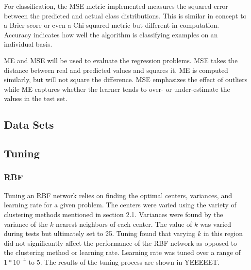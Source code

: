 \documentclass[twoside,11pt]{article}
\begin{document}
For classification, the MSE metric implemented measures the squared error between the predicted and actual class distributions. This is similar in concept to a Brier score or even a Chi-squared metric but different in computation.  Accuracy indicates how well the algorithm is classifying examples on an individual basis.

ME and MSE will be used to evaluate the regression problems. MSE takes the distance between real and predicted values and squares it. ME is computed similarly, but will not square the difference. MSE emphasizes the effect of outliers while ME captures whether the learner tends to over- or under-estimate the values in the test set.
\subsection{Data Sets}
\subsection{Tuning}
\subsubsection{RBF}
Tuning an RBF network relies on finding the optimal centers, variances, and learning rate for a given problem. The centers were varied using the variety of clustering methods mentioned in section 2.1. Variances were found by the variance of the $k$ nearest neighbors of each center. The value of $k$ was varied during tests but ultimately set to 25. Tuning found that varying $k$ in this region did not significantly affect the performance of the RBF network as opposed to the clustering method or learning rate. Learning rate was tuned over a range of $1*10^{-4}$ to $5$. The results of the tuning process are shown in YEEEEET. %
\end{document}
